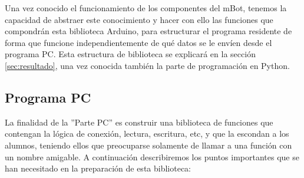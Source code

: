 Una vez conocido el funcionamiento de los componentes del mBot, tenemos la capacidad de abstraer este conocimiento y hacer con ello las funciones que compondrán esta biblioteca Arduino, para estructurar el programa residente de forma que funcione independientemente de qué datos se le envíen desde el programa PC. Esta estructura de biblioteca se explicará en la sección \ref{sec:resultado}, una vez conocida también la parte de programación en Python.
\subsection{Programa PC}\label{subsec:pc}
La finalidad de la ''Parte PC'' es construir una biblioteca de funciones que contengan la lógica de conexión, lectura, escritura, etc, y que la escondan a los alumnos, teniendo ellos que preocuparse solamente de llamar a una función con un nombre amigable. A continuación describiremos los puntos importantes que se han necesitado en la preparación de esta biblioteca:
